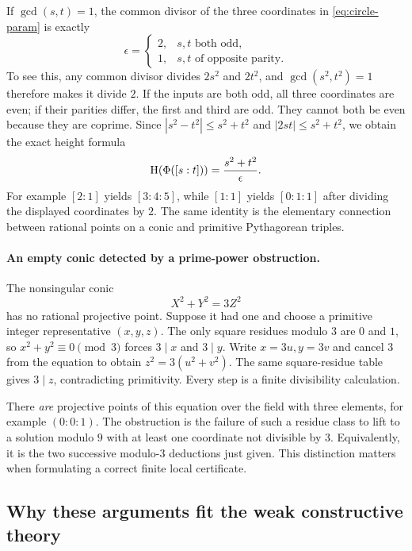 If $\gcd(s,t)=1$, the common divisor of the three coordinates in
\eqref{eq:circle-param} is exactly
\[
 \epsilon=\begin{cases}2,&s,t\text{ both odd},\\1,&s,t\text{ of opposite parity}.
 \end{cases}
\]
To see this, any common divisor divides $2s^2$ and $2t^2$, and
$\gcd(s^2,t^2)=1$ therefore makes it divide $2$.  If the inputs
are both odd, all three coordinates are even; if their parities
differ, the first and third are odd.  They cannot both be even
because they are coprime.  Since
$|s^2-t^2|\leq s^2+t^2$ and $|2st|\leq s^2+t^2$, we obtain the
exact height formula
\begin{equation}\label{eq:circle-exact-height}
 \mathrm H(\Phi([s:t]))=\frac{s^2+t^2}{\epsilon}.
\end{equation}
For example $[2:1]$ yields $[3:4:5]$, while $[1:1]$ yields
$[0:1:1]$ after dividing the displayed coordinates by $2$.
The same identity is the elementary connection between rational
points on a conic and primitive Pythagorean triples.

\paragraph{An empty conic detected by a prime-power obstruction.}
The nonsingular conic
\[
 X^2+Y^2=3Z^2
\]
has no rational projective point.  Suppose it had one and choose
a primitive integer representative $(x,y,z)$.  The only square
residues modulo $3$ are $0$ and $1$, so $x^2+y^2\equiv0\pmod3$
forces $3\mid x$ and $3\mid y$.  Write $x=3u,y=3v$ and cancel
$3$ from the equation to obtain $z^2=3(u^2+v^2)$.  The same
square-residue table gives $3\mid z$, contradicting primitivity.
Every step is a finite divisibility calculation.

There \emph{are} projective points of this equation over the
field with three elements, for example $(0:0:1)$.  The obstruction
is the failure of such a residue class to lift to a solution modulo
$9$ with at least one coordinate not divisible by $3$.  Equivalently,
it is the two successive modulo-$3$ deductions just given.  This
distinction matters when formulating a correct finite local
certificate.

\subsection{Why these arguments fit the weak constructive theory}

